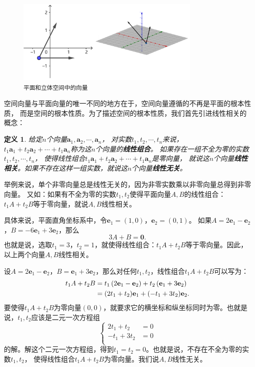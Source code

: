 \documentclass[12pt,UTF8]{ctexbook}
\newtheorem{df}{定义}[section]
\begin{document}
\begin{figure}[h] 
    \centering
    \includegraphics[width=0.8\textwidth]{平面和空间向量1.png}
    \caption*{\texttt{平面和立体空间中的向量}}
\end{figure}

空间向量与平面向量的唯一不同的地方在于，空间向量遵循的不再是平面的根本性质，
而是空间的根本性质。为了描述空间的根本性质，我们首先引进线性相关的概念：
\begin{df}
    给定$n$个向量$\mathbf{a}_1, \mathbf{a}_2, \cdots , \mathbf{a}_n$，
    对实数$t_1, t_2, \cdots , t_n$来说，
    $t_1\mathbf{a}_1 + t_2\mathbf{a}_2 + \cdots + t_1\mathbf{a}_n$称为这$n$个向量的\textbf{线性组合}。
    如果存在一组不全为零的实数$t_1, t_2, \cdots , t_n$，
    使得线性组合$t_1\mathbf{a}_1 + t_2\mathbf{a}_2 + \cdots + t_1\mathbf{a}_n$是零向量，
    就说这$n$个向量\textbf{线性相关}。如果不存在这样一组实数，就说这$n$个向量\textbf{线性无关}。
\end{df}

举例来说，单个非零向量总是线性无关的，因为非零实数乘以非零向量总得到非零向量。
又如：如果有不全为零的实数$t_1,t_2$使得平面向量$A, B$的线性组合：$t_1A + t_2B$等于零向量，就说$A, B$线性相关。

具体来说，平面直角坐标系中，令$\mathbf{e}_1=(1,0)$，$\mathbf{e}_2=(0,1)$。
如果$A = 2\mathbf{e}_1 - \mathbf{e}_2$，$B = -6\mathbf{e}_1 + 3 \mathbf{e}_2$，那么
$$3A + B = \mathbf{0}.$$
也就是说，选取$t_1 = 3$，$t_2 = 1$，就使得线性组合：$t_1A + t_2B$等于零向量。因此，以上两个向量$A, B$线性相关。

设$A = 2\mathbf{e}_1 - \mathbf{e}_2$，$B = \mathbf{e}_1 + 3 \mathbf{e}_2$，那么对任何$t_1,t_2$，线性组合$t_1A + t_2B$可以写为：
\begin{align}
t_1A + t_2B &= t_1 \left( 2\mathbf{e}_1 - \mathbf{e}_2 \right) + t_2 \left( \mathbf{e}_1 + 3 \mathbf{e}_2 \right) \notag \\
&= (2t_1 + t_2) \mathbf{e}_1 + (-t_1 + 3t_2)\mathbf{e}_2.\notag
\end{align}
要使得$t_1A + t_2B$为零向量$(0,0)$，就要求它的横坐标和纵坐标同时为零。也就是说，$t_1,t_2$应该是二元一次方程组
$$
\left\{
\begin{array}{cl}
  2t_1 + t_2 &= 0 \\
  -t_1 +3t_2 &= 0 \\
\end{array}
\right.
$$
的解。解这个二元一次方程组，得到$t_1=t_2=0$。也就是说，不存在不全为零的实数$t_1, t_2$，
使得线性组合$t_1A + t_2B$为零向量。我们说$A, B$线性无关。
\end{document}
